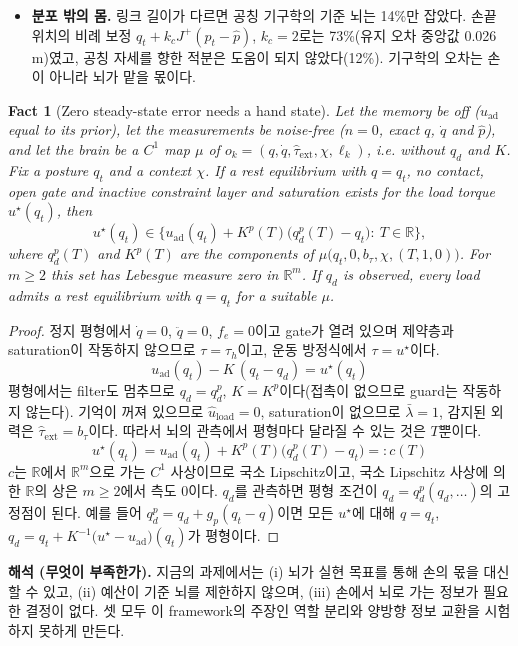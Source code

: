 \documentclass[11pt]{article}\usepackage[margin=1in]{geometry}\usepackage{amsmath,amssymb,amsthm,mathtools}\usepackage{graphicx}\graphicspath{{figures/}{../figures/}{figs/}{./}}\usepackage{enumitem}\usepackage{hyperref}\usepackage{cleveref}\usepackage{tikz}\usetikzlibrary{arrows.meta,positioning,calc,shapes.geometric}\usepackage{float}\usepackage{rotating}\usepackage[most]{tcolorbox}\usepackage{kotex}\usepackage{booktabs}\usepackage{longtable}\emergencystretch=1.6em\tolerance=2000 \crefname{assumption}{Assumption}{Assumptions}\Crefname{assumption}{Assumption}{Assumptions}\crefname{definition}{Definition}{Definitions}\Crefname{definition}{Definition}{Definitions}\crefname{proposition}{Proposition}{Propositions}\Crefname{proposition}{Proposition}{Propositions}\crefname{fact}{Fact}{Facts}\Crefname{fact}{Fact}{Facts} \newtheorem{assumption}{Assumption}\newtheorem{definition}{Definition}\newtheorem{lemma}{Lemma}\newtheorem{proposition}{Proposition}\newtheorem{theorem}{Theorem}\newtheorem{corollary}{Corollary}\newtheorem{fact}{Fact}\theoremstyle{remark}\newtheorem{remark}{Remark} \newcommand{\R}{\mathbb{R}}\newcommand{\xb}{\bar x}\newcommand{\Ab}{\bar A}\newcommand{\By}{\bar B_y}\newcommand{\U}{\mathcal U}\newcommand{\Z}{\mathcal Z}
\begin{document}
\begin{itemize}
\item \textbf{분포 밖의 몸.} 링크 길이가 다르면 공칭 기구학의 기준 뇌는 14\%만 잡았다. 손끝 위치의 비례 보정 $q_t+k_cJ^+(p_t-\hat p)$, $k_c=2$로는 73\%(유지 오차 중앙값 0.026 m)였고, 공칭 자세를 향한 적분은 도움이 되지 않았다(12\%). 기구학의 오차는 손이 아니라 뇌가 맡을 몫이다.
\end{itemize}

\begin{fact}[Zero steady-state error needs a hand state]
\label{fact:noint}
Let the memory be off ($u_{\mathrm{ad}}$ equal to its prior), let the measurements be noise-free ($n=0$, exact $q$, $\dot q$ and $\hat p$), and let the brain be a $C^1$ map $\mu$ of $o_k=(q,\dot q,\hat\tau_{\mathrm{ext}},\chi,\ell_k)$, i.e. without $q_d$ and $K$. Fix a posture $q_t$ and a context $\chi$. If a rest equilibrium with $q=q_t$, no contact, open gate and inactive constraint layer and saturation exists for the load torque $u^\star(q_t)$, then
\[
u^\star(q_t)\in\Big\{u_{\mathrm{ad}}(q_t)+K^p(T)\big(q_d^p(T)-q_t\big):\ T\in\R\Big\},
\]
where $q_d^p(T)$ and $K^p(T)$ are the components of $\mu\big(q_t,0,b_\tau,\chi,(T,1,0)\big)$. For $m\ge2$ this set has Lebesgue measure zero in $\R^m$. If $q_d$ is observed, every load admits a rest equilibrium with $q=q_t$ for a suitable $\mu$.
\end{fact}

\begin{proof}
정지 평형에서 $\dot q=0$, $\ddot q=0$, $f_e=0$이고 gate가 열려 있으며 제약층과 saturation이 작동하지 않으므로 $\tau=\tau_h$이고, 운동 방정식에서 $\tau=u^\star$이다.
\[
u_{\mathrm{ad}}(q_t)-K\,(q_t-q_d)=u^\star(q_t)
\]
평형에서는 filter도 멈추므로 $q_d=q_d^p$, $K=K^p$이다(접촉이 없으므로 guard는 작동하지 않는다). 기억이 꺼져 있으므로 $\hat u_{\mathrm{load}}=0$, saturation이 없으므로 $\bar\lambda=1$, 감지된 외력은 $\hat\tau_{\mathrm{ext}}=b_\tau$이다. 따라서 뇌의 관측에서 평형마다 달라질 수 있는 것은 $T$뿐이다.
\[
u^\star(q_t)=u_{\mathrm{ad}}(q_t)+K^p(T)\big(q_d^p(T)-q_t\big)=:c(T)
\]
$c$는 $\R$에서 $\R^m$으로 가는 $C^1$ 사상이므로 국소 Lipschitz이고, 국소 Lipschitz 사상에 의한 $\R$의 상은 $m\ge2$에서 측도 0이다. $q_d$를 관측하면 평형 조건이 $q_d=q_d^p(q_d,\dots)$의 고정점이 된다. 예를 들어 $q_d^p=q_d+g_p(q_t-q)$이면 모든 $u^\star$에 대해 $q=q_t$, $q_d=q_t+K^{-1}\big(u^\star-u_{\mathrm{ad}}\big)(q_t)$가 평형이다.
\end{proof}

\textbf{해석 (무엇이 부족한가).} 지금의 과제에서는 (i) 뇌가 실현 목표를 통해 손의 몫을 대신할 수 있고, (ii) 예산이 기준 뇌를 제한하지 않으며, (iii) 손에서 뇌로 가는 정보가 필요한 결정이 없다. 셋 모두 이 framework의 주장인 역할 분리와 양방향 정보 교환을 시험하지 못하게 만든다.
\end{document}
